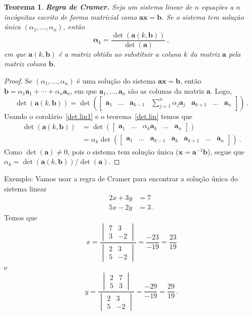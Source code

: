 \documentclass[12pt,a4paper]{report}
\newcommand{\mb}{\mathbf}
\newcommand{\dpar}[1]{\left(#1\right)}
\newtheorem{thm}{Teorema}[chapter]
\begin{document}
\begin{thm}
  \textbf{Regra de Cramer.}
  Seja um sistema linear de $n$ equações a $n$ incógnitas escrito de forma matricial como $\mb {ax}=\mb b$. Se o sistema tem solução única $(\alpha_1,\ldots,\alpha_n)$, então
  $$\mb \alpha_k=\frac{\det(\mb a(k,\mb b))}{\det(\mb a)}\,,$$
  em que $\mb a(k,\mb b)$ é a matriz obtida ao substituir a coluna $k$ da matriz $\mb a$ pela matriz coluna $\mb b$.
\end{thm}
\begin{proof}
  Se $(\alpha_1,\ldots,\alpha_n)$ é uma solução do sistema $\mb {ax}=\mb b$, então $\mb b=\alpha_1\mb a_1+\cdots+\alpha_n\mb a_n$, em que $\mb a_1,\ldots,\mb a_n$ são as colunas da matriz $\mb a$. Logo,
  $$\det(\mb a(k,\mb b))=\det\dpar{\begin{bmatrix}
    \mb a_1&\ldots&\mb a_{k-1}&\sum_{j=1}^n\alpha_j\mb a_j&\mb a_{k+1}&\ldots&\mb a_n
  \end{bmatrix}}\,.$$
  Usando o corolário~\ref{det.lin1} e o teorema~\ref{det.lin} temos que
  \begin{equation*}
    \begin{split}
      \det(\mb a(k,\mb b))&=\det\dpar{\begin{bmatrix}
        \mb a_1&\ldots&\alpha_k\mb a_k&\ldots&\mb a_n
      \end{bmatrix}}\\
      &=\alpha_k\det\dpar{\begin{bmatrix}
        \mb a_1&\ldots&\mb a_{k-1}&\mb a_k&\mb a_{k+1}&\ldots&\mb a_n
      \end{bmatrix}}\,.
    \end{split}
  \end{equation*}
  Como $\det(\mb a)\ne 0$, pois o sistema tem solução única ($\mb x=\mb a^{-1}\mb b$), segue que $\alpha_k=\det(\mb a(k,\mb b))/\det(\mb a)$.
\end{proof}

Exemplo: Vamos usar a regra de Cramer para encontrar a solução única do sistema linear
\begin{equation*}
  \begin{split}
    2x+3y&=7\\
    5x-2y&=3\,.
  \end{split}
\end{equation*}
Temos que
$$x=\frac{\begin{vmatrix}
  7&3\\
  3&-2
\end{vmatrix}}{\begin{vmatrix}
  2&3\\
  5&-2
\end{vmatrix}}=\frac{-23}{-19}=\frac{23}{19}$$
e
$$y=\frac{\begin{vmatrix}
  2&7\\
  5&3
\end{vmatrix}}{\begin{vmatrix}
  2&3\\
  5&-2
\end{vmatrix}}=\frac{-29}{-19}=\frac{29}{19}\,.$$
\end{document}
